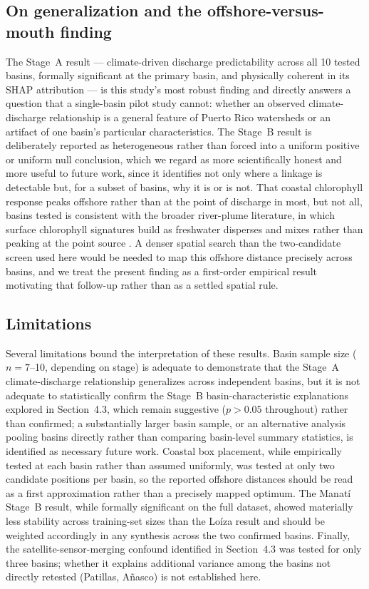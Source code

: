 \documentclass[preprint,12pt]{elsarticle}
\begin{document}
\subsection{On generalization and the offshore-versus-mouth finding}
The Stage~A result --- climate-driven discharge predictability across all 10 tested basins, formally significant at the primary basin, and physically coherent in its SHAP attribution --- is this study's most robust finding and directly answers a question that a single-basin pilot study cannot: whether an observed climate-discharge relationship is a general feature of Puerto Rico watersheds or an artifact of one basin's particular characteristics. The Stage~B result is deliberately reported as heterogeneous rather than forced into a uniform positive or uniform null conclusion, which we regard as more scientifically honest and more useful to future work, since it identifies not only where a linkage is detectable but, for a subset of basins, why it is or is not. That coastal chlorophyll response peaks offshore rather than at the point of discharge in most, but not all, basins tested is consistent with the broader river-plume literature, in which surface chlorophyll signatures build as freshwater disperses and mixes rather than peaking at the point source \citep{auricht2022mapping}. A denser spatial search than the two-candidate screen used here would be needed to map this offshore distance precisely across basins, and we treat the present finding as a first-order empirical result motivating that follow-up rather than as a settled spatial rule.

\subsection{Limitations}
Several limitations bound the interpretation of these results. Basin sample size ($n=7$--10, depending on stage) is adequate to demonstrate that the Stage~A climate-discharge relationship generalizes across independent basins, but it is not adequate to statistically confirm the Stage~B basin-characteristic explanations explored in Section~4.3, which remain suggestive ($p>0.05$ throughout) rather than confirmed; a substantially larger basin sample, or an alternative analysis pooling basins directly rather than comparing basin-level summary statistics, is identified as necessary future work. Coastal box placement, while empirically tested at each basin rather than assumed uniformly, was tested at only two candidate positions per basin, so the reported offshore distances should be read as a first approximation rather than a precisely mapped optimum. The Manatí Stage~B result, while formally significant on the full dataset, showed materially less stability across training-set sizes than the Loíza result and should be weighted accordingly in any synthesis across the two confirmed basins. Finally, the satellite-sensor-merging confound identified in Section~4.3 was tested for only three basins; whether it explains additional variance among the basins not directly retested (Patillas, Añasco) is not established here.
\end{document}
